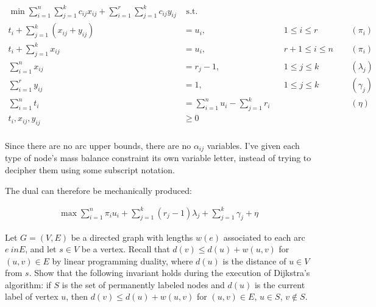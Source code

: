 \documentclass[fleqn]{homework}
\begin{document}
\begin{problem}{2}
    \begin{alignat*}{5}
      \min \sum_{i=1}^n \sum_{j=1}^k c_{ij} x_{ij} + \sum_{i=1}^r \sum_{j=1}^k c_{ij} y_{ij} & \text{ s.t.} \\
      t_i + \sum_{j=1}^k (x_{ij} + y_{ij}) &= u_i, && 1 \le i \le r && (\pi_i)\\
      t_i + \sum_{j=1}^k x_{ij} &= u_i,   &&r+1 \le i \le n \:\:  && (\pi_i)\\
      \sum_{i=1}^n x_{ij} &= r_j - 1,  && 1 \le j \le k && (\lambda_j)\\
      \sum_{i=1}^r y_{ij} &= 1, && 1 \le j \le k && (\gamma_j)\\
      \sum_{i=1}^n t_i &= \sum_{i=1}^n u_i - \sum_{j=1}^k r_i  && && (\eta)\\
      t_i, x_{ij}, y_{ij} &\ge 0  &&\\
    \end{alignat*}

    Since there are no arc upper bounds, there are no $\alpha_{ij}$ variables.
    I've given each type of node's mass balance constraint its own variable
    letter, instead of trying to decipher them using some subscript notation.

    The dual can therefore be mechanically produced:

    \begin{alignat*}{1}
      \max \sum_{i=1}^n \pi_i u_i + \sum_{j=1}^k (r_j-1) \lambda_j + \sum_{j=1}^k \gamma_j + \eta
    \end{alignat*}
  \end{problem}

  \begin{problem}{3}
    \begin{question}
      Let $G=(V, E)$ be a directed graph with lengths $w(e)$ associated to each
      arc $e\ in E$, and let $s \in V$ be a vertex. Recall that
      $d(v) \le d(u) + w(u,v)$ for $(u,v) \in E$ by linear programming duality,
      where $d(u)$ is the distance of $u \in V$ from $s$. Show that the
      following invariant holds during the execution of Dijkstra’s algorithm: if
      $S$ is the set of permanently labeled nodes and $d(u)$ is the current
      label of vertex $u$, then $d(v) \le d(u) + w(u,v)$ for $(u,v) \in E$,
      $u \in S$, $v \not\in S$.
    \end{question}
  \end{problem}
\end{document}
